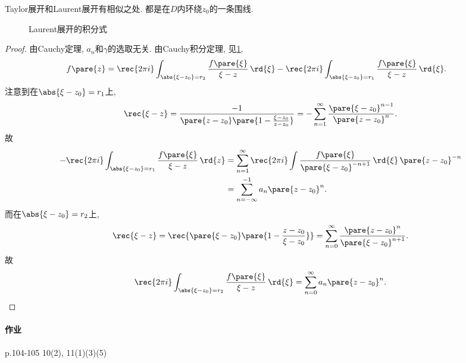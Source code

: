\documentclass{ctexart}
\begin{document}
\begin{remark}
    Taylor展开和Laurent展开有相似之处. 都是在$D$内环绕$z_0$的一条围线.
\end{remark}
\begin{figure}[ht]
    \centering
    \caption{Laurent展开的积分式}
    \label{fig:Laurent展开的积分式}
\end{figure}
\begin{proof}
    由Cauchy定理, $a_n$和$\gamma$的选取无关. 由Cauchy积分定理, 见\cref{fig:Laurent展开的积分式},
    \begin{align*}
        f\pare{z} &= \rec{2\pi i} \int_{\abs{\xi - z_0} = r_2} \frac{f\pare{\xi}}{\xi - z}\,\rd{\xi} - \rec{2\pi i} \int_{\abs{\xi - z_0} = r_1} \frac{f\pare{\xi}}{\xi - z}\,\rd{\xi}.
    \end{align*}
    注意到在$\abs{\xi - z_0} = r_1$上,
    \[ \rec{\xi - z} = \frac{-1}{\pare{z-z_0}\pare{1-\frac{\xi - z_0}{z-z_0}}} = -\sum_{n=1}^\infty \frac{\pare{\xi - z_0}^{n-1}}{\pare{z-z_0}^n}.  \]
    故
    \begin{align*}
        -\rec{2\pi i} \int_{\abs{\xi - z_0} = r_1} \frac{f\pare{\xi}}{\xi - z}\,\rd{z} &= \sum_{n=1}^\infty \rec{2\pi i} \int \frac{f\pare{\xi}}{\pare{\xi - z_0}^{-n+1}} \,\rd{\xi}\,\pare{z-z_0}^{-n}\\ &= \sum_{n=-\infty}^{-1}a_n\pare{z-z_0}^n.
    \end{align*}
    而在$\abs{\xi - z_0} = r_2$上,
    \[ \rec{\xi - z} = \rec{\pare{\xi - z_0}\pare{1-\frac{z - z_0}{\xi - z_0}}} = \sum_{n=0}^\infty \frac{\pare{z-z_0}^n}{\pare{\xi - z_0}^{n+1}}. \]
    故
    \[ \rec{2\pi i}\int_{\abs{\xi - z_0} = r_2} \frac{f\pare{\xi}}{\xi - z}\,\rd{\xi} = \sum_{n=0}^\infty a_n\pare{z-z_0}^n. \qedhere \]
\end{proof}

\paragraph{作业} %
\label{par:作业}

p.104-105 10(2), 11(1)(3)(5)

\end{document}

